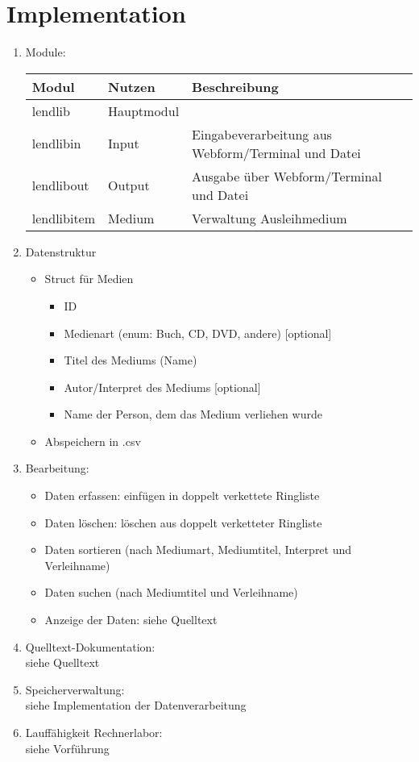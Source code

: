 \section{Implementation}
\begin{enumerate}
\item Module:\\
\begin{tabular}{l l l}
Modul & Nutzen & Beschreibung\\
\hline
lendlib & Hauptmodul & \\
lendlibin & Input & Eingabeverarbeitung aus Webform/Terminal und Datei\\
lendlibout & Output & Ausgabe über Webform/Terminal und Datei\\
lendlibitem & Medium & Verwaltung Ausleihmedium\\
\end{tabular}
\item Datenstruktur
\begin{itemize}
\item Struct für Medien
\begin{itemize}
\item ID
\item Medienart (enum: Buch, CD, DVD, andere) [optional]
\item Titel des Mediums (Name)
\item Autor/Interpret des Mediums [optional]
\item Name der Person, dem das Medium verliehen wurde
\end{itemize}
\item Abspeichern in .csv
\end{itemize}
\item Bearbeitung:
\begin{itemize}
\item Daten erfassen: einfügen in doppelt verkettete Ringliste
\item Daten löschen: löschen aus doppelt verketteter Ringliste
\item Daten sortieren (nach Mediumart, Mediumtitel, Interpret und Verleihname)
\item Daten suchen (nach Mediumtitel und Verleihname)
\item Anzeige der Daten: siehe Quelltext
\end{itemize}
\item Quelltext-Dokumentation:\\
siehe Quelltext
\item Speicherverwaltung:\\
siehe Implementation der Datenverarbeitung
\item Lauffähigkeit Rechnerlabor:\\
siehe Vorführung
\end{enumerate}


